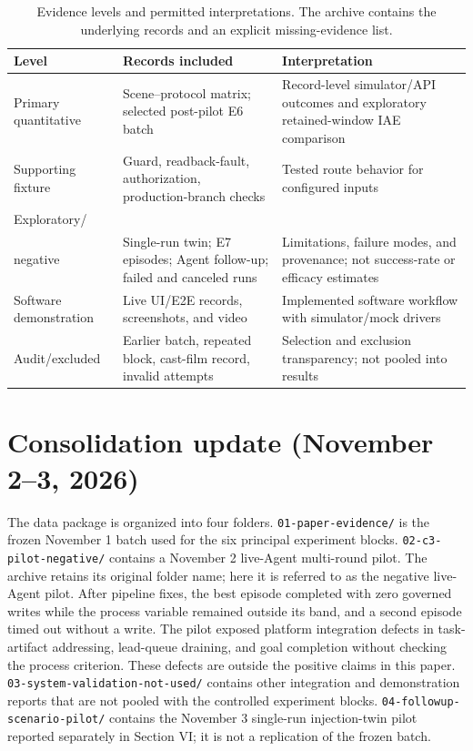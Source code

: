 \documentclass[10pt]{article}
\begin{document}
\begin{table}[htbp]
\centering
\caption{Evidence levels and permitted interpretations. The archive contains the underlying records and an explicit missing-evidence list.}
\scriptsize
\setlength{\tabcolsep}{2pt}
\begin{tabularx}{\textwidth}{@{}>{\raggedright\arraybackslash}p{2.1cm}>{\raggedright\arraybackslash}p{2.8cm}>{\raggedright\arraybackslash}X@{}}
\toprule
Level & Records included & Interpretation \\
\midrule
Primary quantitative & Scene--protocol matrix; selected post-pilot E6 batch & Record-level simulator/API outcomes and exploratory retained-window IAE comparison \\ 
Supporting fixture & Guard, readback-fault, authorization, production-branch checks & Tested route behavior for configured inputs \\ 
Exploratory/\\negative & Single-run twin; E7 episodes; Agent follow-up; failed and canceled runs & Limitations, failure modes, and provenance; not success-rate or efficacy estimates \\ 
Software demonstration & Live UI/E2E records, screenshots, and video & Implemented software workflow with simulator/mock drivers \\ 
Audit/excluded & Earlier batch, repeated block, cast-film record, invalid attempts & Selection and exclusion transparency; not pooled into results \\ 
\bottomrule
\end{tabularx}
\end{table}

\section*{Consolidation update (November 2--3, 2026)}
The data package is organized into four folders. \texttt{01-paper-evidence/} is the frozen November 1 batch used for the six principal experiment blocks. \texttt{02-c3-pilot-negative/} contains a November 2 live-Agent multi-round pilot. The archive retains its original folder name; here it is referred to as the negative live-Agent pilot. After pipeline fixes, the best episode completed with zero governed writes while the process variable remained outside its band, and a second episode timed out without a write. The pilot exposed platform integration defects in task-artifact addressing, lead-queue draining, and goal completion without checking the process criterion. These defects are outside the positive claims in this paper. \texttt{03-system-validation-not-used/} contains other integration and demonstration reports that are not pooled with the controlled experiment blocks. \texttt{04-followup-scenario-pilot/} contains the November 3 single-run injection-twin pilot reported separately in Section VI; it is not a replication of the frozen batch.
\end{document}
